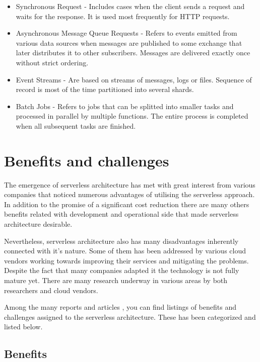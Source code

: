 \begin{itemize}
    \item Synchronous Request - Includes cases when the client sends a request and waits for the response. It is used most frequently for HTTP requests.
    \item Asynchronous Message Queue Requests - Refers to events emitted from various data sources when messages are published to some exchange that later distributes it to other subscribers. Messages are delivered exactly once without strict ordering.
    \item Event Streams - Are based on streams of messages, logs or files. Sequence of record is most of the time partitioned into several shards.
    \item Batch Jobs - Refers to jobs that can be splitted into smaller tasks and processed in parallel by multiple functions. The entire process is completed when all subsequent tasks are finished.
\end{itemize}

\section{Benefits and challenges}

The emergence of serverless architecture has met with great interest from various companies that noticed numerous advantages of utilising the serverless approach. In addition to the promise of a significant cost reduction there are many others benefits related with development and operational side that made serverless architecture desirable. 

Nevertheless, serverless architecture also has many disadvantages inherently connected with it's nature. Some of them has been addressed by various cloud vendors working towards improving their services and mitigating the problems. Despite the fact that many companies adapted it the technology is not fully mature yet. There are many research underway in various areas by both researchers and cloud vendors.

Among the many reports and articles \cite{MartinFowlerServerless} \cite{BerkeleyServerless}, you can find listings of benefits and challenges assigned to the serverless architecture. These has been categorized and listed below.

\subsection{Benefits}

